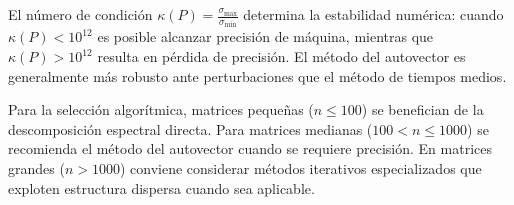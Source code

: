 El número de condición $\kappa(P) = \frac{\sigma_{\max}}{\sigma_{\min}}$ determina la estabilidad numérica: cuando $\kappa(P) < 10^{12}$ es posible alcanzar precisión de máquina, mientras que $\kappa(P) > 10^{12}$ resulta en pérdida de precisión. El método del autovector es generalmente más robusto ante perturbaciones que el método de tiempos medios.

Para la selección algorítmica, matrices pequeñas ($n \leq 100$) se benefician de la descomposición espectral directa. Para matrices medianas ($100 < n \leq 1000$) se recomienda el método del autovector cuando se requiere precisión. En matrices grandes ($n > 1000$) conviene considerar métodos iterativos especializados que exploten estructura dispersa cuando sea aplicable.
